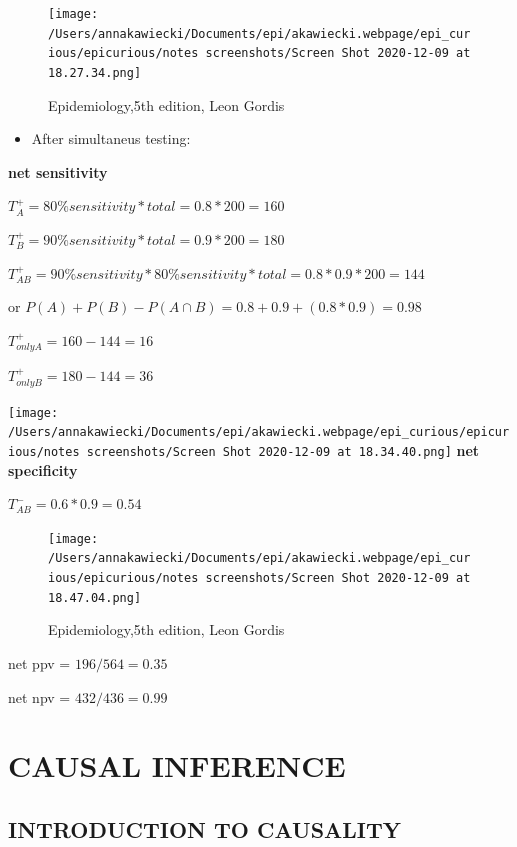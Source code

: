 \documentclass[
]{article}
\providecommand{\tightlist}{%
  \setlength{\itemsep}{0pt}\setlength{\parskip}{0pt}}
\begin{document}
\begin{figure}
\centering
\texttt{[image: /Users/annakawiecki/Documents/epi/akawiecki.webpage/epi\_curious/epicurious/notes screenshots/Screen Shot 2020-12-09 at 18.27.34.png]}
\caption{Epidemiology,5th edition, Leon Gordis}
\end{figure}

\begin{itemize}
\tightlist
\item
  After simultaneus testing:
\end{itemize}

\textbf{net sensitivity}

\(T_A^+ =80\%sensitivity * total = 0.8*200= 160\)

\(T_B^+ =90\%sensitivity * total = 0.9*200= 180\)

\(T_{AB}^+ =90\%sensitivity * 80\%sensitivity* total = 0.8* 0.9*200= 144\)

or \(P(A)+P(B)-P(A\cap B) = 0.8+0.9+ (0.8*0.9) = 0.98\)

\(T_{only A}^+ = 160-144=16\)

\(T_{only B}^+ = 180-144=36\)

\texttt{[image: /Users/annakawiecki/Documents/epi/akawiecki.webpage/epi\_curious/epicurious/notes screenshots/Screen Shot 2020-12-09 at 18.34.40.png]}
\textbf{net specificity}

\(T_{AB}^-= 0.6*0.9 = 0.54\)

\begin{figure}
\centering
\texttt{[image: /Users/annakawiecki/Documents/epi/akawiecki.webpage/epi\_curious/epicurious/notes screenshots/Screen Shot 2020-12-09 at 18.47.04.png]}
\caption{Epidemiology,5th edition, Leon Gordis}
\end{figure}

net ppv = \(196/564=0.35\)

net npv = \(432/436=0.99\)

\hypertarget{causal-inference}{%
\section{\texorpdfstring{\textbf{CAUSAL
INFERENCE}}{CAUSAL INFERENCE}}\label{causal-inference}}

\hypertarget{introduction-to-causality}{%
\subsection{INTRODUCTION TO CAUSALITY}\label{introduction-to-causality}}
\end{document}
